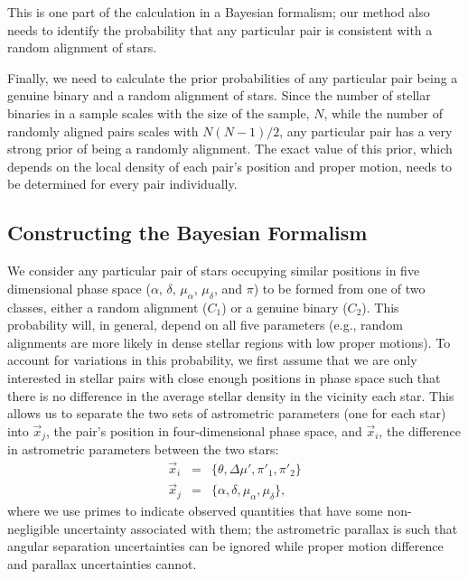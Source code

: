 \documentclass[usenatbib]{mnras}
\begin{document}
This is one part of the calculation in a Bayesian formalism; our method also needs to identify the probability that any particular pair is consistent with a random alignment of stars. 


Finally, we need to calculate the prior probabilities of any particular pair being a genuine binary and a random alignment of stars. Since the number of stellar binaries in a sample scales with the size of the sample, $N$, while the number of randomly aligned pairs scales with $N(N-1)/2$, any particular pair has a very strong prior of being a randomly alignment. The exact value of this prior, which depends on the local density of each pair's position and proper motion, needs to be determined for every pair individually.



\subsection{Constructing the Bayesian Formalism}


We consider any particular pair of stars occupying similar positions in five dimensional phase space ($\alpha$, $\delta$, $\mu_{\alpha}$, $\mu_{\delta}$, and $\pi$) to be formed from one of two classes, either a random alignment ($C_1$) or a genuine binary ($C_2$). This probability will, in general, depend on all five parameters (e.g., random alignments are more likely in dense stellar regions with low proper motions). To account for variations in this probability, we first assume that we are only interested in stellar pairs with close enough positions in phase space such that there is no difference in the average stellar density in the vicinity each star. This allows us to separate the two sets of astrometric parameters (one for each star) into $\vec{x}_j$, the pair's position in four-dimensional phase space, and $\vec{x}_i$, the difference in astrometric parameters between the two stars:
\begin{eqnarray}
\vec{x}_i &=& \{\theta, \Delta \mu', \pi'_1, \pi'_2 \} \\
\vec{x}_j &=& \{ \alpha, \delta, \mu_{\alpha}, \mu_{\delta} \},
\end{eqnarray}
where we use primes to indicate observed quantities that have some non-negligible uncertainty associated with them; the astrometric parallax is such that angular separation uncertainties can be ignored while proper motion difference and parallax uncertainties cannot. 
\end{document}
